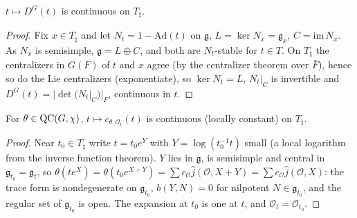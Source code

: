 \begin{lemma}
\label{continuousOn_weylDisc_torusNat}
\leanok
{}
$t\mapsto D^G(t)$ is continuous on $T_\natural$.
\end{lemma}
\begin{proof}
\leanok
{}
Fix $x\in T_\natural$ and let $N_t=1-\mathrm{Ad}(t)$ on $\mathfrak g$, $L=\ker N_x=\mathfrak g_x$, $C=\mathrm{im}\,N_x$. As $N_x$ is semisimple, $\mathfrak g=L\oplus C$, and both are $N_t$-stable for $t\in T$. On $T_\natural$ the centralizers in $G(F)$ of $t$ and $x$ agree (by the centralizer theorem over $\bar F$), hence so do the Lie centralizers (exponentiate), so $\ker N_t=L$, $N_t|_C$ is invertible and $D^G(t)=|\det(N_t|_C)|_F$, continuous in $t$.
\end{proof}

\begin{lemma}
\label{continuousOn_germ_of_mem_QC}
\leanok
{}
For $\theta\in\mathrm{QC}(G,\chi)$, $t\mapsto c_{\theta,\mathcal O_t}(t)$ is continuous (locally constant) on $T_\natural$.
\end{lemma}
\begin{proof}
\leanok
{}
Near $t_0\in T_\natural$ write $t=t_0e^Y$ with $Y=\log(t_0^{-1}t)$ small (a local logarithm from the inverse function theorem). $Y$ lies in $\mathfrak g$, is semisimple and central in $\mathfrak g_{t_0}=\mathfrak g_t$, so $\theta(te^X)=\theta(t_0e^{X+Y})=\sum c_{\mathcal O}\hat{j}(\mathcal O,X+Y)=\sum c_{\mathcal O}\hat{j}(\mathcal O,X)$: the trace form is nondegenerate on $\mathfrak g_{t_0}$, $b(Y,N)=0$ for nilpotent $N\in\mathfrak g_{t_0}$, and the regular set of $\mathfrak g_{t_0}$ is open. The expansion at $t_0$ is one at $t$, and $\mathcal O_t=\mathcal O_{t_0}$.
\end{proof}

